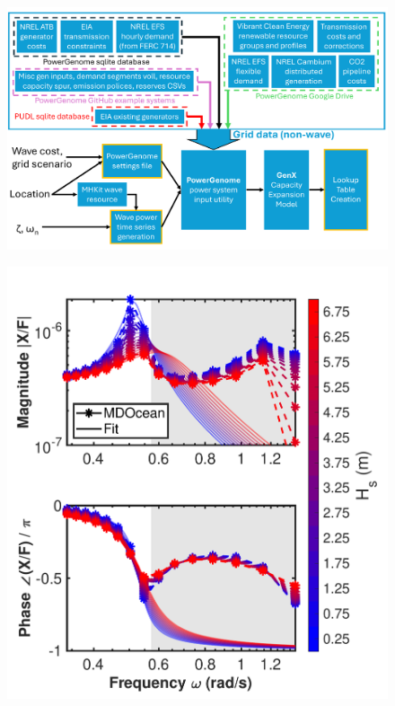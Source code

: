 \documentclass[10pt,twoside]{article}
\newif\ifplaceholder
\let\originalincludegraphics\includegraphics
\renewcommand{\includegraphics}[2][]{%
  \ifplaceholder
    \begin{tikzpicture}
      \node[anchor=south west, inner sep=0] (img) at (0,0) {\originalincludegraphics[#1]{#2}};
      \node at ($(img.south east)!0.5!(img.north west)$)
        [fill=white,opacity=0.8,text=red,font=\huge] {Placeholder};
    \end{tikzpicture}
    \vspace{-\baselineskip}
  \else
    \originalincludegraphics[#1]{#2}%
  \fi
  \placeholderfalse %
}
\begin{document}
\begin{figure}[t]
\noindent
\begin{minipage}[b]{0.64\textwidth}
    \centering
    \includegraphics[width=\linewidth]{figures/PowerGenomeDataFlow_no_beta.pdf}
    \label{fig:CEM-data-flow}
\end{minipage}
\hfill
\begin{minipage}[b]{0.38\textwidth}
    \centering
    \includegraphics[width=\linewidth]{figures/bode_per_wave_height.pdf}
    \label{fig:bode}
\end{minipage}
\end{figure}
\end{document}
